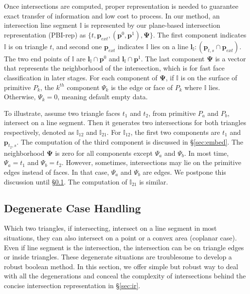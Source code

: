 \documentclass[10pt,journal,compsoc]{IEEEtran}
\begin{document}
Once intersections are computed, proper representation is needed to guarantee exact transfer of information and low cost to process. In our method, an intersection line segment $\mathbb{I}$ is represented by our plane-based intersection representation (PBI-rep) as $\{t, \bm{p}_{ext}, (\bm{p}^0, \bm{p}^1),\bm{\Psi}\}$. The first component indicates $\mathbb{I}$ is on triangle $t$, and second one $\bm{p}_{ext}$ indicates $\mathbb{I}$ lies on a line $\bm{l}_{\mathbb{I}}\colon(\bm{p}_{t, s} \cap \bm{p}_{ext})$. The two end points of $\mathbb{I}$ are $\bm{l}_{\mathbb{I}}\cap\bm{p}^0$ and $\bm{l}_{\mathbb{I}}\cap\bm{p}^1$. The last component $\bm{\Psi}$ is a vector that represents the neighborhood of the intersection, which is for fast face classification in later stages. For each component of $\bm{\Psi}$, if $\mathbb{I}$ is on the surface of primitive $P_k$, the $k^{th}$ component $\Psi_{k}$ is the edge or face of $P_k$ where $\mathbb{I}$ lies. Otherwise, $\Psi_{k}=0$, meaning default empty data.

To illustrate, assume two triangle faces $t_1$ and $t_2$, from primitive $P_a$ and $P_b$, intersect on a line segment. Then it generates two intersections for both triangles respectively, denoted as ${\mathbb{I}}_{12}$ and ${\mathbb{I}}_{21}$. For ${\mathbb{I}}_{12}$, the first two components are $t_1$ and $\bm{p}_{t_2, s}$. The computation of the third component is discussed in \S\ref{sec:embed}. The neighborhood $\bm{\Psi}$ is zero for all components except $\Psi_a$ and $\Psi_b$. In most time, $\Psi_a=t_1$ and $\Psi_b=t_2$. However, sometimes, intersections may lie on the primitive edges instead of faces. In that case, $\Psi_a$ and $\Psi_b$ are edges. We postpone this discussion until \S\ref{sec:degenerate}. The computation of ${\mathbb{I}}_{21}$ is similar.


\subsection{Degenerate Case Handling}
\label{sec:degenerate}

Which two triangles, if intersecting, intersect on a line segment in most situations, they can also intersect on a point or a convex area (coplanar case). Even if line segment is the intersection, the intersection can be on triangle edges or inside triangles. These degenerate situations are troublesome to develop a robust boolean method. In this section, we offer simple but robust way to deal with all the degenerations and conceal the complexity of intersections behind the concise intersection representation in \S\ref{sec:ir}.
\end{document}
